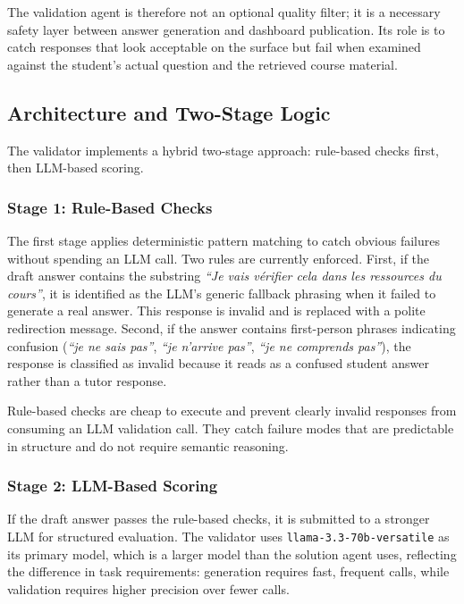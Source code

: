 \documentclass[12pt, a4paper]{article}
\begin{document}
The validation agent is therefore not an optional quality filter; it is a necessary safety layer between answer generation and dashboard publication. Its role is to catch responses that look acceptable on the surface but fail when examined against the student's actual question and the retrieved course material.

\subsection{Architecture and Two-Stage Logic}

The validator implements a hybrid two-stage approach: rule-based checks first, then LLM-based scoring.

\subsubsection{Stage 1: Rule-Based Checks}

The first stage applies deterministic pattern matching to catch obvious failures without spending an LLM call. Two rules are currently enforced. First, if the draft answer contains the substring \textit{``Je vais vérifier cela dans les ressources du cours''}, it is identified as the LLM's generic fallback phrasing when it failed to generate a real answer. This response is invalid and is replaced with a polite redirection message. Second, if the answer contains first-person phrases indicating confusion (\textit{``je ne sais pas''}, \textit{``je n'arrive pas''}, \textit{``je ne comprends pas''}), the response is classified as invalid because it reads as a confused student answer rather than a tutor response.

Rule-based checks are cheap to execute and prevent clearly invalid responses from consuming an LLM validation call. They catch failure modes that are predictable in structure and do not require semantic reasoning.

\subsubsection{Stage 2: LLM-Based Scoring}

If the draft answer passes the rule-based checks, it is submitted to a stronger LLM for structured evaluation. The validator uses \texttt{llama-3.3-70b-versatile} as its primary model, which is a larger model than the solution agent uses, reflecting the difference in task requirements: generation requires fast, frequent calls, while validation requires higher precision over fewer calls.
\end{document}
